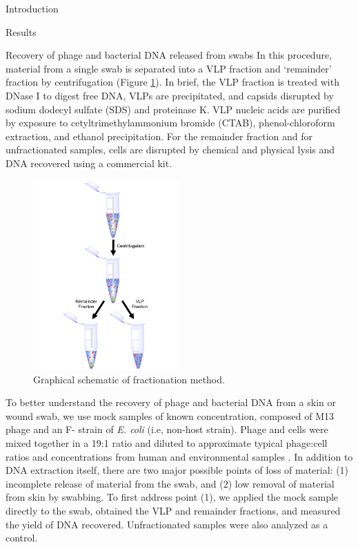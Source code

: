 \documentclass[oneside,12pt,final]{sty/ucthesis-CA2012}
\begin{document}
\begin{mainmatter}
\begin{section}{Introduction}
\end{section}

\begin{section}{Results}
\begin{subsection}{Recovery of phage and bacterial DNA released from swabs}
In this procedure, material from a single swab is separated into a VLP fraction and ‘remainder’ fraction by centrifugation (Figure \ref{fig:fracscheme}). In brief, the VLP fraction is treated with DNase I to digest free DNA, VLPs are precipitated, and capsids disrupted by sodium dodecyl sulfate (SDS) and proteinase K. VLP nucleic acids are purified by exposure to cetyltrimethylammonium bromide (CTAB), phenol-chloroform extraction, and ethanol precipitation. For the remainder fraction and for unfractionated samples, cells are disrupted by chemical
and physical lysis and DNA recovered using a commercial kit.

\begin{figure}
\centerline{\includegraphics[width=0.5\textwidth]{fig/C2fig1.pdf}}
\caption{Graphical schematic of fractionation method.}
\label{fig:fracscheme}
\end{figure}

To better understand the recovery of phage and bacterial DNA from a skin or wound swab, we use mock samples of known concentration, composed of M13 phage and an F- strain of \textit{E. coli} (i.e, non-host strain). Phage and cells were mixed together in a 19:1 ratio and diluted to approximate typical phage:cell ratios and concentrations from human and environmental samples \cite{RN68}. In addition to DNA extraction itself, there are two major possible points of loss of material: (1) incomplete release of material from the swab, and (2) low removal of material from skin by swabbing. To first address point (1), we applied the mock sample directly to the swab, obtained the VLP and remainder fractions, and measured the yield of DNA recovered. Unfractionated samples were also analyzed as a control.


\end{subsection}
\end{section}
\end{mainmatter}
\end{document}

